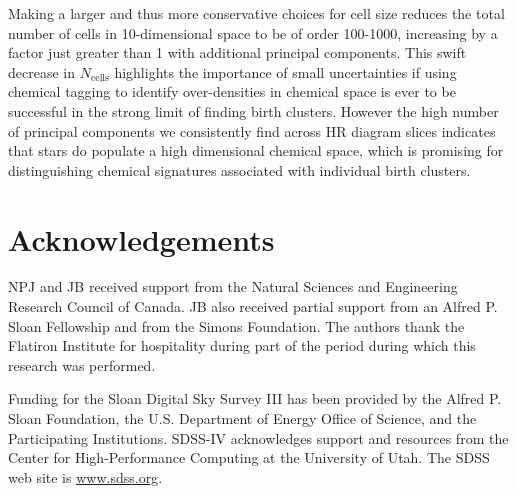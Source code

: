 \documentclass[a4paper,fleqn,usenatbib]{mnras}
\begin{document}
 Making a larger and thus more conservative choices for cell size reduces the total number of cells in 10-dimensional space to be of order 100-1000, increasing by a factor just greater than 1 with additional principal components. This swift decrease in $N_{\mathrm{cells}}$ highlights the importance of small uncertainties if using chemical tagging to identify over-densities in chemical space is ever to be successful in the strong limit of finding birth clusters. However the high number of principal components we consistently find across HR diagram slices indicates that stars do populate a high dimensional chemical space, which is promising for distinguishing chemical signatures associated with individual birth clusters. 

\section*{Acknowledgements}

NPJ and JB received support from the Natural Sciences and Engineering Research Council of Canada. JB also received partial support from an Alfred P. Sloan Fellowship and from the Simons Foundation. The authors thank the Flatiron Institute for hospitality during part of the period during which this research was performed.

Funding for the Sloan Digital Sky Survey III has been provided by
the Alfred P. Sloan Foundation, the U.S. Department of Energy Office of
Science, and the Participating Institutions. SDSS-IV acknowledges
support and resources from the Center for High-Performance Computing at
the University of Utah. The SDSS web site is \url{www.sdss.org}.



\end{document}
